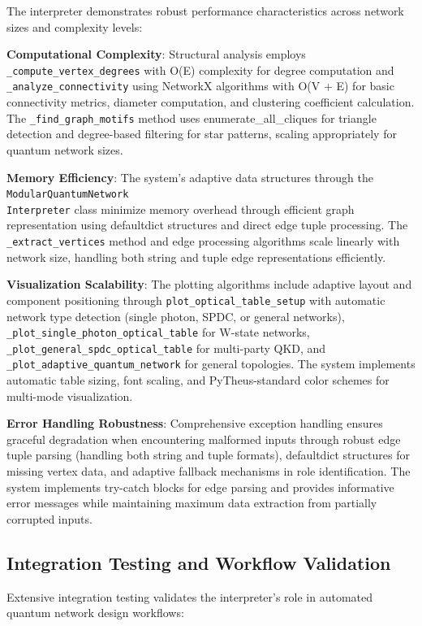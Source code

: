 \documentclass[11pt,a4paper]{article}
\begin{document}
The interpreter demonstrates robust performance characteristics across network sizes and complexity levels:

\textbf{Computational Complexity}: Structural analysis employs \texttt{\_compute\_vertex\_degrees} with O(E) complexity for degree computation and \texttt{\_analyze\_connectivity} using NetworkX algorithms with O(V + E) for basic connectivity metrics, diameter computation, and clustering coefficient calculation. The \texttt{\_find\_graph\_motifs} method uses enumerate\_all\_cliques for triangle detection and degree-based filtering for star patterns, scaling appropriately for quantum network sizes.

\textbf{Memory Efficiency}: The system's adaptive data structures through the \texttt{ModularQuantumNetwork\\Interpreter} class minimize memory overhead through efficient graph representation using defaultdict structures and direct edge tuple processing. The \texttt{\_extract\_vertices} method and edge processing algorithms scale linearly with network size, handling both string and tuple edge representations efficiently.

\textbf{Visualization Scalability}: The plotting algorithms include adaptive layout and component positioning through \texttt{plot\_optical\_table\_setup} with automatic network type detection (single photon, SPDC, or general networks), \texttt{\_plot\_single\_photon\_optical\_table} for W-state networks, \texttt{\_plot\_general\_spdc\_optical\_table} for multi-party QKD, and \texttt{\_plot\_adaptive\_quantum\_network} for general topologies. The system implements automatic table sizing, font scaling, and PyTheus-standard color schemes for multi-mode visualization.

\textbf{Error Handling Robustness}: Comprehensive exception handling ensures graceful degradation when encountering malformed inputs through robust edge tuple parsing (handling both string and tuple formats), defaultdict structures for missing vertex data, and adaptive fallback mechanisms in role identification. The system implements try-catch blocks for edge parsing and provides informative error messages while maintaining maximum data extraction from partially corrupted inputs.

\subsection{Integration Testing and Workflow Validation}

Extensive integration testing validates the interpreter's role in automated quantum network design workflows:
\end{document}
